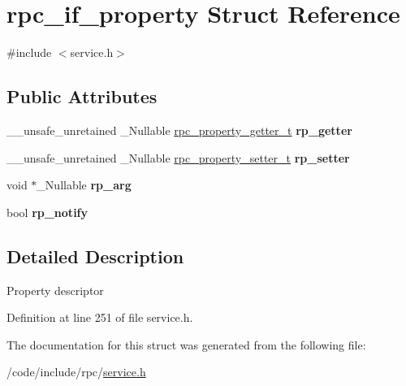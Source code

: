 \hypertarget{structrpc__if__property}{}\section{rpc\+\_\+if\+\_\+property Struct Reference}
\label{structrpc__if__property}


{\ttfamily \#include $<$service.\+h$>$}

\subsection*{Public Attributes}
\begin{DoxyCompactItemize}
\item 
\mbox{\label{structrpc__if__property_ae19b459a98e396cb5f6f8e4938d6c018}} 
\+\_\+\+\_\+unsafe\+\_\+unretained \+\_\+\+Nullable \hyperlink{service_8h_ab438f0c33f3f3876f1c9a23d62134f16}{rpc\+\_\+property\+\_\+getter\+\_\+t} {\bfseries rp\+\_\+getter}
\item 
\mbox{\label{structrpc__if__property_a45fe384e6ad2355ba81781fe16b9d421}} 
\+\_\+\+\_\+unsafe\+\_\+unretained \+\_\+\+Nullable \hyperlink{service_8h_aa8b38d8ab3bafe79a96edaebafe13b8d}{rpc\+\_\+property\+\_\+setter\+\_\+t} {\bfseries rp\+\_\+setter}
\item 
\mbox{\label{structrpc__if__property_a81d2953a7a4bdff1775330c29992546b}} 
void $\ast$\+\_\+\+Nullable {\bfseries rp\+\_\+arg}
\item 
\mbox{\label{structrpc__if__property_ac8c71dd42b3981bc522dc1bbb3534b39}} 
bool {\bfseries rp\+\_\+notify}
\end{DoxyCompactItemize}


\subsection{Detailed Description}
Property descriptor 

Definition at line 251 of file service.\+h.



The documentation for this struct was generated from the following file\+:\begin{DoxyCompactItemize}
\item 
/code/include/rpc/\hyperlink{service_8h}{service.\+h}\end{DoxyCompactItemize}
